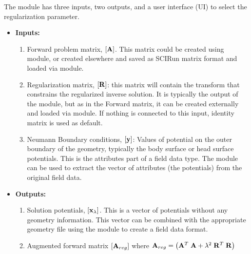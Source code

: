 The  module has three inputs, two outputs, and a user
interface (UI) to select the regularization parameter. 
%
\begin{itemize} 
  \item {\bf Inputs:} 
        \begin{enumerate}          
          \item Forward problem matrix, $\left[{\bf A}\right]$. This matrix
                could be created using  module, or
                created elsewhere and saved as SCIRun matrix format and
                loaded via  module.
          \item Regularization matrix, $\left[{\bf R}\right]$: this matrix will
                contain the transform that constrains the regularized
                inverse solution. It is typically the output of the
                 module, but as in the Forward matrix,
                it can be created externally and loaded via
                 module. If nothing is connected to
                this input, identity matrix is used as default.
          \item Neumann Boundary conditions, $\left[{\bf y}\right]$: Values of
                potential on the outer boundary of the geometry, typically
                the body surface or head surface potentials. This is the
                attributes part of a field data type. The
                 module can be used to extract the
                vector of attributes (\ie the potentials) from the original
                field data.
        \end{enumerate}         
      
  \item {\bf Outputs:} 
        \begin{enumerate}         
          \item Solution potentials, $\left[{\bf x}_{\lambda}\right]$. This
                is a vector of potentials without any geometry
                information. This vector can be combined with the
                appropriate geometry file using the
                 module to create a field data
                format.
          \item Augmented forward matrix $\left[{\bf A}_{reg}\right]$ where
                ${\bf A}_{reg} = \left( {\bf A}^{T}\;{\bf A} +
                \lambda^{2}\;{\bf R}^{T}\;{\bf R}\right)$ 
        \end{enumerate}         
             

\end{itemize}
